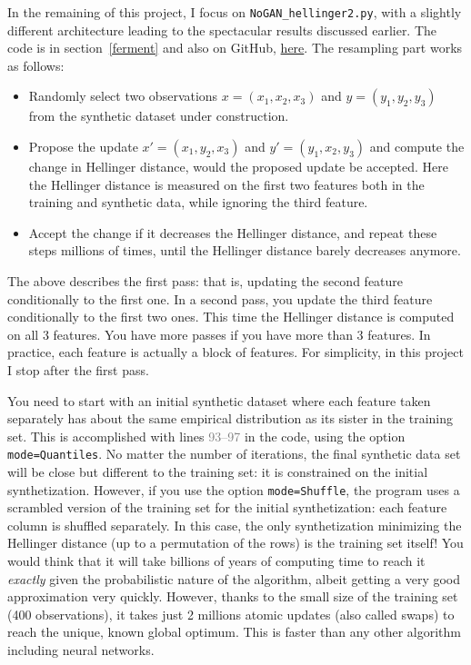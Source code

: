 \documentclass[oneside,10pt]{book}
\begin{document}
In the remaining of this project, 
I focus on \texttt{NoGAN\_hellinger2.py}, with a slightly different architecture leading to the spectacular
 results discussed earlier. The code is in section~\ref{ferment} and also on GitHub,
 \href{https://github.com/VincentGranville/Main/blob/main/NoGAN_Hellinger2.py}{here}. The resampling part works as follows: 
\vspace{1ex}

\begin{itemize}
\item Randomly select two observations $x = (x_1, x_2, x_3)$ and $y = (y_1, y_2, y_3)$ from the synthetic dataset under construction. 
\item Propose the update $x' = (x_1, y_2, x_3)$ and $y' = (y_1, x_2, y_3)$ and compute the change in Hellinger distance, would the proposed update be accepted.
Here the Hellinger distance is measured on the first two features both in the training and synthetic data, while ignoring the third feature.
\item Accept the change if it decreases the Hellinger distance, and repeat these steps millions of times, until the Hellinger distance barely decreases anymore.
\end{itemize}
\vspace{1ex}

\noindent The above describes the first pass: that is, updating the second feature conditionally to the first one. In a second pass, you update the third feature conditionally to the first two ones. This time the Hellinger distance is computed on all 3 features. You have more passes if you have more than 3 features. In practice, each feature is actually a block of features. For simplicity, in this project I stop after the first pass.  

You need to start with an initial synthetic dataset where each feature taken separately has about the same empirical distribution as its sister in the training set. 
This is accomplished with lines \textcolor{gray}{93--97} in the code, using the option \texttt{mode=\textquotesingle Quantiles\textquotesingle}. No matter the number of iterations, the final synthetic data set will be close but different to the training set: it is constrained on the initial synthetization. However, if you use the option
 \texttt{mode=\textquotesingle Shuffle\textquotesingle}, the program uses a scrambled version of the training set for the initial synthetization: each feature column is shuffled separately. 
In this case, the only synthetization minimizing the Hellinger distance (up to a permutation of the rows) is the training set itself! You would think that it will
 take billions of years of computing time to reach it {\em exactly} given the probabilistic nature of the algorithm, albeit getting a very good approximation very quickly.  However, thanks to the small size of the training set (400 observations), it takes just 2 millions atomic updates (also called swaps) to reach the unique, known global optimum. This is faster than any other algorithm
 including neural networks. 
\end{document}
